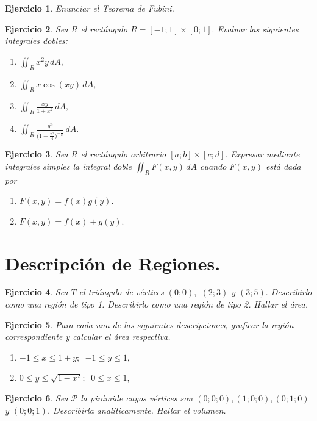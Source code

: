 \documentclass[11pt,a4paper,pdftex]{amsart}
\newtheorem{ej}{Ejercicio}%
\numberwithin{equation}{section}%
\newcommand{\bej}[1]{\begin{ej}\rm{#1}}
\newcommand{\eej}{\end{ej}\vspace{-0.2cm}}
\newcommand{\0}{\mathbb O}
\newcommand{\8}{\infty}
\begin{document}
\bej Enunciar el Teorema de Fubini.
\eej

\bej  Sea $R$ el rect\'angulo $R=[-1; 1]\times[0;1].$ Evaluar las siguientes integrales dobles:
\begin{multicols}{2}
\begin{enumerate}
 \item $\iint_R x^2 y \,dA,$


 \item $ \iint_R x \cos(xy)\, dA,$


 \item $\iint_R \frac{xy}{1+x^2} \, dA,$



 \item $\iint_R \frac{y^n}{({1-\frac{x^2}{4})^{-\frac{1}{2}}}} \, dA.$
\end{enumerate}
\end{multicols}
\eej

\bej Sea $R$ el rect\'angulo arbitrario $[a;b]\times[c;d].$ Expresar mediante integrales simples la integral doble
$\iint_R F(x,y) \,dA$ cuando $F(x,y)$ est\'a dada por
\begin{enumerate}
  \item $F(x,y)=f(x) g(y).$
   \item $ F(x,y)=f(x)+g(y).$
 \end{enumerate}
\eej


\section{Descripci\'on de Regiones.}

\bej Sea $T $ el tri\'angulo de v\'ertices $(0;0),$ $(2;3)$ y $(3;5).$ Describirlo como una regi\'on de tipo 1. Describirlo como una regi\'on de tipo 2. Hallar el \'area. \eej

\bej Para cada una de las siguientes descripciones, graficar la regi\'on correspondiente y calcular el \'area respectiva.
\begin{enumerate}
\item $-1 \leq x \leq 1+y;$ \,$-1\leq y \leq 1,$
\item $0\leq y \leq \sqrt{1-x^2};$\, $0\leq x\leq 1,$

\end{enumerate}
\eej

\bej Sea $\mathcal{P}$ la pirámide cuyos vértices son $(0;0;0), (1;0;0), (0;1;0)$ y $(0;0;1)$. Describirla analíticamente. Hallar el volumen. 
\eej
\end{document}
